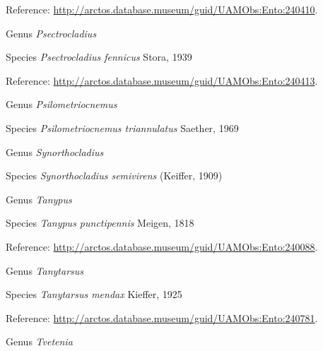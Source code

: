 \documentclass[9pt, article]{memoir}
\begin{document}
\begin{multicols}{2}
Reference: 
\url{http://arctos.database.museum/guid/UAMObs:Ento:240410}.

\vspace{6pt}\noindent\hspace{30pt}Genus \textit{Psectrocladius}


\vspace{6pt}\noindent\hspace{36pt}Species \textit{Psectrocladius fennicus} Stora, 1939


Reference: 
\url{http://arctos.database.museum/guid/UAMObs:Ento:240413}.

\vspace{6pt}\noindent\hspace{30pt}Genus \textit{Psilometriocnemus}


\vspace{6pt}\noindent\hspace{36pt}Species \textit{Psilometriocnemus triannulatus} Saether, 1969


\vspace{6pt}\noindent\hspace{30pt}Genus \textit{Synorthocladius}


\vspace{6pt}\noindent\hspace{36pt}Species \textit{Synorthocladius semivirens} (Keiffer, 1909)


\vspace{6pt}\noindent\hspace{30pt}Genus \textit{Tanypus}


\vspace{6pt}\noindent\hspace{36pt}Species \textit{Tanypus punctipennis} Meigen, 1818


Reference: 
\url{http://arctos.database.museum/guid/UAMObs:Ento:240088}.

\vspace{6pt}\noindent\hspace{30pt}Genus \textit{Tanytarsus}


\vspace{6pt}\noindent\hspace{36pt}Species \textit{Tanytarsus mendax} Kieffer, 1925


Reference: 
\url{http://arctos.database.museum/guid/UAMObs:Ento:240781}.

\vspace{6pt}\noindent\hspace{30pt}Genus \textit{Tvetenia}



\end{multicols}
\end{document}

